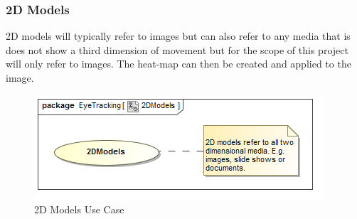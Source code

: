 	\subsubsection{2D Models}
	2D models will typically refer to images but can also refer to any media that is does not show a third dimension of movement but for the scope of this project will only refer to images. The heat-map can then be created and applied to the image.
	\newline
	\begin{figure}[!ht]
		\centering
		\includegraphics[scale=0.5]{Diagrams/Use_Case_Diagram__2DModels.png}
		\caption{2D Models Use Case}
	\end{figure}
